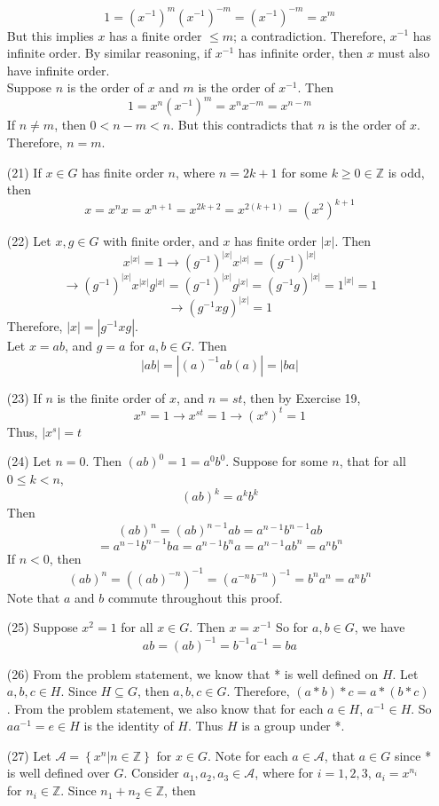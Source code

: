 \documentclass[12pt]{article}
\begin{document}
\begin{itemize}
$$1 = (x^{-1})^m(x^{-1})^{-m} = (x^{-1})^{-m} = x^m$$
But this implies $x$ has a finite order $\leq m$; a contradiction. Therefore, $x^{-1}$ has infinite order. By similar reasoning, if $x^{-1}$ has infinite order, then $x$ must also have infinite order. \\
Suppose $n$ is the order of $x$ and $m$ is the order of $x^{-1}$. Then
$$1 = x^n(x^{-1})^m = x^nx^{-m} = x^{n - m}$$
If $n \neq m$, then $0 < n - m < n$. But this contradicts that $n$ is the order of $x$. Therefore, $n = m$.
\item[(21)]
If $x \in G$ has finite order $n$, where $n = 2k + 1$ for some $k \geq 0 \in \mathbb{Z}$ is odd, then
$$x = x^nx = x^{n + 1} = x^{2k + 2} = x^{2(k + 1)} = (x^2)^{k + 1}$$
\item[(22)]
Let $x, g \in G$ with finite order, and $x$ has finite order $|x|$. Then
$$x^{|x|} = 1 \rightarrow (g^{-1})^{|x|}x^{|x|} = (g^{-1})^{|x|}$$
$$\rightarrow (g^{-1})^{|x|}x^{|x|}g^{|x|} = (g^{-1})^{|x|}g^{|x|} = (g^{-1}g)^{|x|} = 1^{|x|} = 1$$
$$\rightarrow (g^{-1}xg)^{|x|} = 1$$
Therefore, $|x| = |g^{-1}xg|$. \\
Let $x = ab$, and $g = a$ for $a, b \in G$. Then
$$|ab| = |(a)^{-1}ab(a)| = |ba|$$
\item[(23)]
If $n$ is the finite order of $x$, and $n = st$, then by Exercise 19,
$$x^n = 1 \rightarrow x^{st} = 1 \rightarrow (x^s)^t = 1$$
Thus, $|x^s| = t$
\item[(24)] Let $n = 0$. Then $(ab)^0 = 1 = a^0b^0$. Suppose for some $n$, that for all $0 \leq k < n$,
$$(ab)^k = a^kb^k$$
Then
$$(ab)^n = (ab)^{n - 1}ab = a^{n-1}b^{n-1}ab$$
$$= a^{n-1}b^{n-1}ba = a^{n-1}b^na = a^{n-1}ab^n = a^nb^n$$
If $n < 0$, then
$$(ab)^n = ((ab)^{-n})^{-1} = (a^{-n}b^{-n})^{-1} = b^na^n = a^nb^n$$
Note that $a$ and $b$ commute throughout this proof.
\item[(25)]
Suppose $x^2 = 1$ for all $x \in G$. Then $x = x^{-1}$ So for $a, b \in G$, we have
$$ab = (ab)^{-1} = b^{-1}a^{-1} = ba$$
\item[(26)]
From the problem statement, we know that * is well defined on $H$. Let $a, b, c \in H$. Since $H \subseteq G$, then $a, b, c \in G$. Therefore, $(a * b) * c = a * (b * c)$. From the problem statement, we also know that for each $a \in H$, $a^{-1} \in H$. So $aa^{-1} = e \in H$ is the identity of $H$. Thus $H$ is a group under *.
\item[(27)]
Let $\mathcal{A} = \left\lbrace x^n | n \in \mathbb{Z}\right\rbrace$ for $x \in G$. Note for each $a \in \mathcal{A}$, that $a \in G$ since * is well defined over $G$. Consider $a_1, a_2, a_3 \in \mathcal{A}$, where for $i = 1, 2, 3$, $a_i = x^{n_i}$ for $n_i \in \mathbb{Z}$. Since $n_1 + n_2 \in \mathbb{Z}$, then

\end{itemize}
\end{document}
